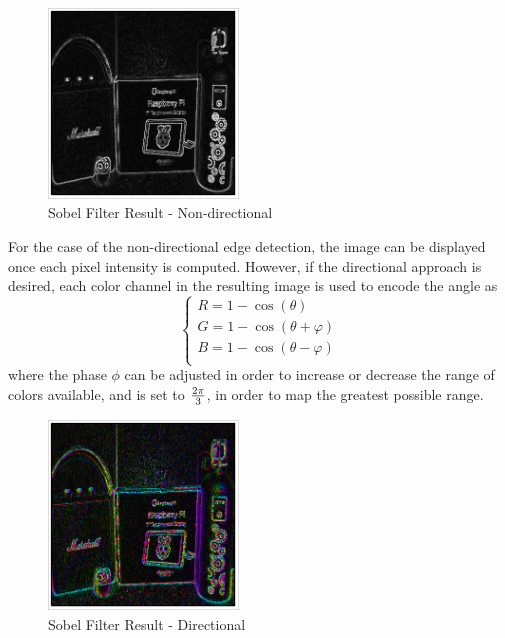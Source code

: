 \begin{figure}[H]
	\includegraphics[width=0.45\textwidth, height=0.45\textwidth]{resources/Sobel_2.png}
	\caption{Sobel Filter Result - Non-directional}
\end{figure}

For the case of the non-directional edge detection, the image can be displayed once each pixel intensity is
computed. However, if the directional approach is desired, each color channel in the resulting image is used
to encode the angle as
\begin{equation}
	\label{eq:sobelRGB}
	\begin{cases}
		R = {1 - \cos(\theta)}           \\
		G = {1 - \cos(\theta + \varphi)} \\
		B = {1 - \cos(\theta - \varphi)} \\
	\end{cases}
\end{equation}
where the phase \(\phi\) can be adjusted in order to increase or decrease the range of colors available, and
is set to \(2\pi\over3\), in order to map the greatest possible range.

\begin{figure}[H]
	\includegraphics[width=0.45\textwidth, height=0.45\textwidth]{resources/Sobel_6.png}
	\caption{Sobel Filter Result - Directional}
\end{figure}

